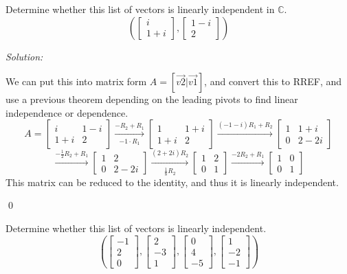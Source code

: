 \documentclass[11 pt]{article}
\newenvironment{problem}[2][Problem]{\begin{trivlist}
\item[\hskip \labelsep {\bfseries #1}\hskip \labelsep {\bfseries #2.}]}{\end{trivlist}}
\newenvironment{sol}
    {\emph{Solution:}
    }
    {
    \qed
    }
\theoremstyle{definition}
\newcommand{\C}{\mathbb{C}} %
\begin{document}
\begin{problem}{3.1.2a}
Determine whether this list of vectors is linearly independent in $\C$.\\
\[\left (\begin{bmatrix}
i\\1+i
\end{bmatrix},\begin{bmatrix}
1-i\\2
\end{bmatrix}\right )\]
\end{problem}
\begin{sol}
We can put this into matrix form $A=[\vec{v2}|\vec{v1}]$, and convert this to RREF, and use a previous theorem depending on the leading pivots to find linear independence or dependence.
\[A=\begin{bmatrix}
i & 1-i \\ 1+i & 2
\end{bmatrix}\xrightarrow[-1\cdot R_1]{-R_2+R_1}\begin{bmatrix}
1 & 1+i\\1+i&2
\end{bmatrix}\xrightarrow{(-1-i)R_1+R_2}\begin{bmatrix}
1 & 1+i\\
0 & 2-2i
\end{bmatrix}\]
\[\xrightarrow{-\frac{1}{2}R_2+R_1}\begin{bmatrix}
1 & 2\\0 & 2-2i
\end{bmatrix}\xrightarrow[\frac{1}{8}R_2]{(2+2i)R_2}\begin{bmatrix}
1 & 2 \\ 0 & 1
\end{bmatrix}\xrightarrow{-2R_2+R_1}\begin{bmatrix}
1 & 0 \\ 0 & 1
\end{bmatrix}\]
This matrix can be reduced to the identity, and thus it is linearly independent.
\end{sol}

\begin{problem}{3.1.2b}
Determine whether this list of vectors is linearly independent. \\
\[\left (\begin{bmatrix}
-1 \\ 2 \\ 0
\end{bmatrix},\begin{bmatrix}
2\\-3\\1
\end{bmatrix},
\begin{bmatrix}
0\\4\\-5
\end{bmatrix},
\begin{bmatrix}
1 \\ -2 \\ -1
\end{bmatrix}
\right )\]
\end{problem}
\end{document}
